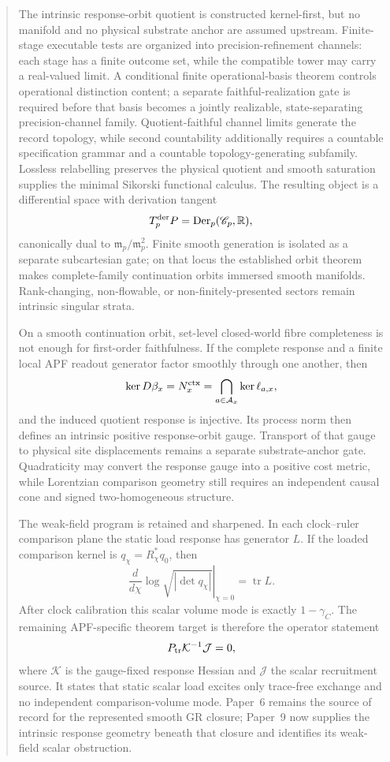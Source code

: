 \documentclass[11pt]{article}
\theoremstyle{remark}
\newcommand{\Ptr}{P_{\rm tr}}
\begin{document}
\begin{abstract}
The intrinsic response-orbit quotient is constructed kernel-first, but no manifold and no physical substrate anchor are assumed upstream.  Finite-stage executable tests are organized into precision-refinement channels: each stage has a finite outcome set, while the compatible tower may carry a real-valued limit.  A conditional finite operational-basis theorem controls operational distinction content; a separate faithful-realization gate is required before that basis becomes a jointly realizable, state-separating precision-channel family.  Quotient-faithful channel limits generate the record topology, while second countability additionally requires a countable specification grammar and a countable topology-generating subfamily.  Lossless relabelling preserves the physical quotient and smooth saturation supplies the minimal Sikorski functional calculus.  The resulting object is a differential space with derivation tangent
\[
T_p^{\rm der}P=\operatorname{Der}_p(\mathscr C_p,\mathbb R),
\]
canonically dual to $\mathfrak m_p/\mathfrak m_p^2$.  Finite smooth generation is isolated as a separate subcartesian gate; on that locus the established orbit theorem makes complete-family continuation orbits immersed smooth manifolds.  Rank-changing, non-flowable, or non-finitely-presented sectors remain intrinsic singular strata.

On a smooth continuation orbit, set-level closed-world fibre completeness is not enough for first-order faithfulness.  If the complete response and a finite local APF readout generator factor smoothly through one another, then
\[
\ker D\beta_x
= N_x^{\rm ctx}
=\bigcap_{a\in\mathcal A_x}\ker\ell_{a,x},
\]
and the induced quotient response is injective.  Its process norm then defines an intrinsic positive response-orbit gauge.  Transport of that gauge to physical site displacements remains a separate substrate-anchor gate.  Quadraticity may convert the response gauge into a positive cost metric, while Lorentzian comparison geometry still requires an independent causal cone and signed two-homogeneous structure.

The weak-field program is retained and sharpened.  In each clock--ruler comparison plane the static load response has generator $L$.  If the loaded comparison kernel is $q_\chi=R_\chi^*q_0$, then
\[
        \left.\frac{d}{d\chi}
        \log\sqrt{|\det q_\chi|}\right|_{\chi=0}
        =\operatorname{tr}L.
\]
After clock calibration this scalar volume mode is exactly $1-\gamma_C$.  The remaining APF-specific theorem target is therefore the operator statement
\[
        \Ptr\mathcal K^{-1}\mathcal J=0,
\]
where $\mathcal K$ is the gauge-fixed response Hessian and $\mathcal J$ the scalar recruitment source.  It states that static scalar load excites only trace-free exchange and no independent comparison-volume mode.  Paper~6 remains the source of record for the represented smooth GR closure; Paper~9 now supplies the intrinsic response geometry beneath that closure and identifies its weak-field scalar obstruction.
\end{abstract}
\end{document}
